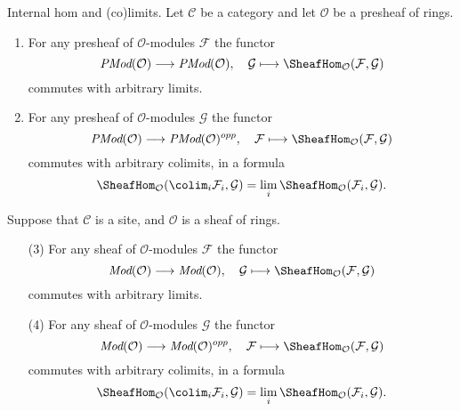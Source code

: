 \begin{lemma}
\label{lemma-internal-hom-commute-limits}
Internal hom and (co)limits.
Let $\mathcal{C}$ be a category and let $\mathcal{O}$ be a presheaf of rings.
\begin{enumerate}
\item For any presheaf of $\mathcal{O}$-modules $\mathcal{F}$ the functor
$$
\textit{PMod}(\mathcal{O}) \longrightarrow \textit{PMod}(\mathcal{O})
, \quad
\mathcal{G} \longmapsto \SheafHom_\mathcal{O}(\mathcal{F}, \mathcal{G})
$$
commutes with arbitrary limits.
\item For any presheaf of $\mathcal{O}$-modules $\mathcal{G}$ the functor
$$
\textit{PMod}(\mathcal{O}) \longrightarrow \textit{PMod}(\mathcal{O})^{opp}
, \quad
\mathcal{F} \longmapsto \SheafHom_\mathcal{O}(\mathcal{F}, \mathcal{G})
$$
commutes with arbitrary colimits, in a formula
$$
\SheafHom_\mathcal{O}(\colim_i \mathcal{F}_i, \mathcal{G})
=
\lim_i \SheafHom_\mathcal{O}(\mathcal{F}_i, \mathcal{G}).
$$
\end{enumerate}
Suppose that $\mathcal{C}$ is a site, and $\mathcal{O}$ is a sheaf of rings.
\begin{enumerate}
\item[(3)] For any sheaf of $\mathcal{O}$-modules $\mathcal{F}$ the functor
$$
\textit{Mod}(\mathcal{O}) \longrightarrow \textit{Mod}(\mathcal{O})
, \quad
\mathcal{G} \longmapsto \SheafHom_\mathcal{O}(\mathcal{F}, \mathcal{G})
$$
commutes with arbitrary limits.
\item[(4)] For any sheaf of $\mathcal{O}$-modules $\mathcal{G}$ the functor
$$
\textit{Mod}(\mathcal{O}) \longrightarrow \textit{Mod}(\mathcal{O})^{opp}
, \quad
\mathcal{F} \longmapsto \SheafHom_\mathcal{O}(\mathcal{F}, \mathcal{G})
$$
commutes with arbitrary colimits, in a formula
$$
\SheafHom_\mathcal{O}(\colim_i \mathcal{F}_i, \mathcal{G})
=
\lim_i \SheafHom_\mathcal{O}(\mathcal{F}_i, \mathcal{G}).
$$
\end{enumerate}
\end{lemma}

